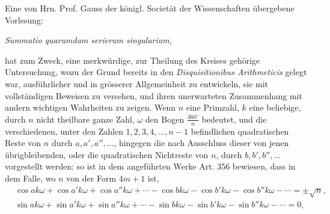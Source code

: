 \documentclass[12pt]{article}
\begin{document}
Eine von Hrn. Prof. Gauss der königl. Societät der Wissenschaften übergebene Vorlesung:
\begin{center}\textit{Summatio quarumdam serierum singularium},\end{center}
hat zum Zweck, eine merkwürdige, zur Theilung des Kreises gehörige Untersuchung, wozu der Grund bereits in den \textit{Disquisitionibus Arithmeticis} gelegt war, ausführlicher und in grösserer Allgemeinheit zu entwickeln, sie mit vollständigen Beweisen zu versehen, und ihren unerwarteten Zusammenhang mit andern wichtigen Wahrheiten zu zeigen. Wenn $n$ eine Primzahl, $k$ eine beliebige, durch $n$ nicht theilbare ganze Zahl, $\omega$ den Bogen $\frac{360^\circ}{n}$ bedeutet, und die verschiedenen, unter den Zahlen $1,2,3,4,\ldots,n-1$ befindlichen quadratischen Reste von $n$ durch $a,a',a'',\ldots$, hingegen die nach Ausschluss dieser von jenen übrigbleibenden, oder die quadratischen Nichtreste von $n$, durch $b,b',b'',\ldots$ vorgestellt werden: so ist in dem angeführten Werke Art. 356 bewiesen, dass in dem Falle, wo $n$ von der Form $4m+1$ ist,
\begin{align*}
&\cos ak\omega+\cos a'k\omega+\cos a''k\omega+\cdots
 -\cos bk\omega-\cos b'k\omega-\cos b''k\omega-\cdots = \pm\sqrt n,\\
&\sin ak\omega+\sin a'k\omega+\sin a''k\omega+\cdots
 -\sin bk\omega-\sin b'k\omega-\sin b''k\omega-\cdots =0,
\end{align*}
\end{document}
